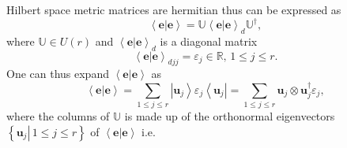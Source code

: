 \documentclass[aps,preprint]{revtex4}%
\begin{document}
Hilbert space metric matrices are hermitian thus can be expressed as
\begin{equation}
\left\langle \left.  \mathbf{e}\right\vert \mathbf{e}\right\rangle
=\mathbb{U}\left\langle \left.  \mathbf{e}\right\vert \mathbf{e}\right\rangle
_{d}\mathbb{U}^{\dagger},
\end{equation}
where $\mathbb{U\in}U\left(  r\right)  $ and $\left\langle \left.
\mathbf{e}\right\vert \mathbf{e}\right\rangle _{d}$ is a diagonal matrix
\begin{equation}
\left\langle \left.  \mathbf{e}\right\vert \mathbf{e}\right\rangle
_{djj}=\varepsilon_{j}\in\mathbb{R},\,1\leq j\leq r.
\end{equation}
One can thus expand $\left\langle \left.  \mathbf{e}\right\vert \mathbf{e}%
\right\rangle $ as
\begin{equation}
\left\langle \left.  \mathbf{e}\right\vert \mathbf{e}\right\rangle
=\sum\limits_{1\leq j\leq r}\left\vert \mathbf{u}_{j}\right\rangle
\varepsilon_{j}\left\langle \mathbf{u}_{j}\right\vert =\sum\limits_{1\leq
j\leq r}\mathbf{u}_{j}\otimes\mathbf{u}_{j}^{\dagger}\varepsilon_{j},
\end{equation}
where the columns of $\mathbb{U}$ is made up of the orthonormal eigenvectors
$\left\{  \left.  \mathbf{u}_{j}\right\vert \,1\leq j\leq r\right\}  $ of
$\left\langle \left.  \mathbf{e}\right\vert \mathbf{e}\right\rangle $ i.e.
\end{document}
